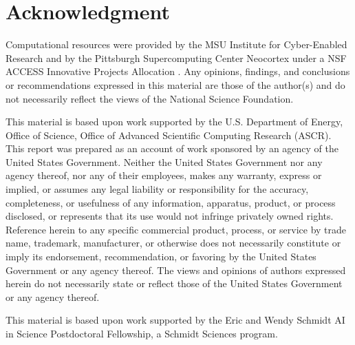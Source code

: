 \section*{Acknowledgment}
\begin{footnotesize}
Computational resources were provided by the MSU Institute for Cyber-Enabled Research and by the Pittsburgh Supercomputing Center Neocortex under a NSF ACCESS Innovative Projects Allocation \citep{buitrago2021neocortex,boerner2023pearc}.
Any opinions, findings, and conclusions or recommendations expressed in this material are those of the author(s) and do not necessarily reflect the views of the National Science Foundation.

This material is based upon work supported by the U.S. Department of Energy, Office of Science, Office of Advanced Scientific Computing Research (ASCR).
This report was prepared as an account of work sponsored by an agency of the United States Government.
Neither the United States Government nor any agency thereof, nor any of their employees, makes any warranty, express or implied, or assumes any legal liability or responsibility for the accuracy, completeness, or usefulness of any information, apparatus, product, or process disclosed, or represents that its use would not infringe privately owned rights.
Reference herein to any specific commercial product, process, or service by trade name, trademark, manufacturer, or otherwise does not necessarily constitute or imply its endorsement, recommendation, or favoring by the United States Government or any agency thereof.
The views and opinions of authors expressed herein do not necessarily state or reflect those of the United States Government or any agency thereof.

This material is based upon work supported by the Eric and Wendy Schmidt AI in Science Postdoctoral Fellowship, a Schmidt Sciences program.
\end{footnotesize}
